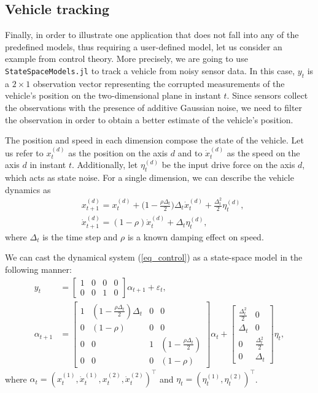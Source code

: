 \documentclass{juliacon}
\begin{document}
\subsection{Vehicle tracking}

Finally, in order to illustrate one application that does not fall into any of the predefined models, thus requiring a user-defined model, let us consider an example from control theory. More precisely, we are going to use \texttt{StateSpaceModels.jl} to track a vehicle from noisy sensor data. In this case, $y_t$ is a $2 \times 1$ observation vector representing the corrupted measurements of the vehicle's position on the two-dimensional plane in instant $t$. Since sensors collect the observations with the presence of additive Gaussian noise, we need to filter the observation in order to obtain a better estimate of the vehicle's position.

The position and speed in each dimension compose the state of the vehicle. Let us refer to $x_t^{(d)}$ as the position on the axis $d$ and to $\dot{x}^{(d)}_t$ as the speed on the axis $d$ in instant $t$. Additionally, let $\eta^{(d)}_t$ be the input drive force on the axis $d$, which acts as state noise. For a single dimension, we can describe the vehicle dynamics as 
\begin{equation}
\begin{aligned}
    & x_{t+1}^{(d)} = x_t^{(d)} + \Big( 1 - \frac{\rho \Delta_t}{2} \Big) \Delta_t \dot{x}^{(d)}_t + \frac{\Delta^2_t}{2} \eta_t^{(d)}, \\
    & \dot{x}^{(d)}_{t+1} = (1 - \rho) \dot{x}^{(d)}_{t} + \Delta_t \eta^{(d)}_t,
\end{aligned}\label{eq_control}
\end{equation}
where $\Delta_t$ is the time step and $\rho$ is a known damping effect on speed. 

We can cast the dynamical system (\ref{eq_control}) as a state-space model in the following manner:
\begin{align*} 
    y_t &= \begin{bmatrix} 1 & 0 & 0 & 0 \\ 0 & 0 & 1 & 0 \end{bmatrix} \alpha_{t+1} + \varepsilon_t, \\
    \alpha_{t+1} &= \begin{bmatrix} 1 & (1 - \tfrac{\rho \Delta_t}{2}) \Delta_t & 0 & 0 \\ 0 & (1 - \rho) & 0 & 0 \\ 0 & 0 & 1 & (1 - \tfrac{\rho \Delta_t}{2}) \\ 0 & 0 & 0 & (1 - \rho) \end{bmatrix} \alpha_{t} + \begin{bmatrix} \tfrac{\Delta^2_t}{2} & 0 \\ \Delta_t & 0 \\ 0 & \tfrac{\Delta^2_t}{2} \\ 0 & \Delta_t \end{bmatrix} \eta_{t},
\end{align*}
where $\alpha_t = (x_t^{(1)}, \dot{x}^{(1)}_{t}, x_t^{(2)}, \dot{x}^{(2)}_{t})^{\top}$ and $\eta_t = (\eta^{(1)}_t, \eta^{(2)}_t)^{\top}$.
\end{document}

